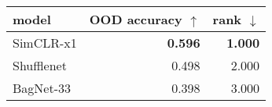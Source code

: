 \begin{tabular}{lrr}
\toprule
     model & OOD accuracy $\uparrow$ & rank $\downarrow$ \\
\midrule
 SimCLR-x1 &          \textbf{0.596} &    \textbf{1.000} \\
Shufflenet &                   0.498 &             2.000 \\
 BagNet-33 &                   0.398 &             3.000 \\
\bottomrule
\end{tabular}


